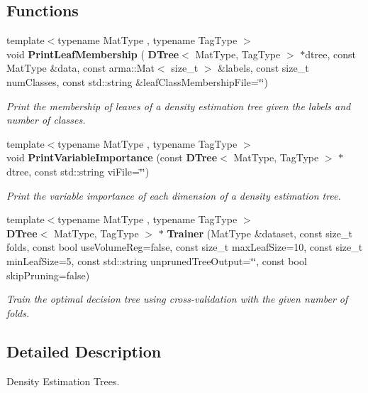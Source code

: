 \subsection*{Functions}
\begin{DoxyCompactItemize}
\item 
{\footnotesize template$<$typename Mat\+Type , typename Tag\+Type $>$ }\\void \textbf{ Print\+Leaf\+Membership} (\textbf{ D\+Tree}$<$ Mat\+Type, Tag\+Type $>$ $\ast$dtree, const Mat\+Type \&data, const arma\+::\+Mat$<$ size\+\_\+t $>$ \&labels, const size\+\_\+t num\+Classes, const std\+::string \&leaf\+Class\+Membership\+File=\char`\"{}\char`\"{})
\begin{DoxyCompactList}\small\item\em Print the membership of leaves of a density estimation tree given the labels and number of classes. \end{DoxyCompactList}\item 
{\footnotesize template$<$typename Mat\+Type , typename Tag\+Type $>$ }\\void \textbf{ Print\+Variable\+Importance} (const \textbf{ D\+Tree}$<$ Mat\+Type, Tag\+Type $>$ $\ast$dtree, const std\+::string vi\+File=\char`\"{}\char`\"{})
\begin{DoxyCompactList}\small\item\em Print the variable importance of each dimension of a density estimation tree. \end{DoxyCompactList}\item 
{\footnotesize template$<$typename Mat\+Type , typename Tag\+Type $>$ }\\\textbf{ D\+Tree}$<$ Mat\+Type, Tag\+Type $>$ $\ast$ \textbf{ Trainer} (Mat\+Type \&dataset, const size\+\_\+t folds, const bool use\+Volume\+Reg=false, const size\+\_\+t max\+Leaf\+Size=10, const size\+\_\+t min\+Leaf\+Size=5, const std\+::string unpruned\+Tree\+Output=\char`\"{}\char`\"{}, const bool skip\+Pruning=false)
\begin{DoxyCompactList}\small\item\em Train the optimal decision tree using cross-\/validation with the given number of folds. \end{DoxyCompactList}\end{DoxyCompactItemize}


\subsection{Detailed Description}
Density Estimation Trees. 

